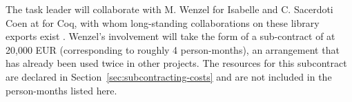 \begin{workpackage}[id=structuring,type=RTD,
  short={Structure of the encyclopedia},%
  title={Structure of the encyclopedia},
  lead=FAU,
  SacRM=40,
  FauRM=20,
  BolRM=4
]
\begin{tasklist}
\begin{task}[id=strontorepml,title=Ontological Representation of Formal Libraries,lead=Fau,FauRM=6,BolRM=4,SacRM=4,wphases=12-48!.5]
The task leader will collaborate with M. Wenzel for Isabelle and C. Sacerdoti Coen at  for Coq, with whom long-standing collaborations on these library exports exist \cite{MRS:coq:19,CKMRSW:ulo:19,KRW:isabelle:19}.
Wenzel's involvement will take the form of a sub-contract of  at 20,000 EUR (corresponding to roughly 4 person-months), an arrangement that has already been used twice in other projects.
The resources for this subcontract are declared in Section~\ref{sec:subcontracting-costs} and are not included in the person-months listed here.
\end{task}




\end{tasklist}



\end{workpackage}
